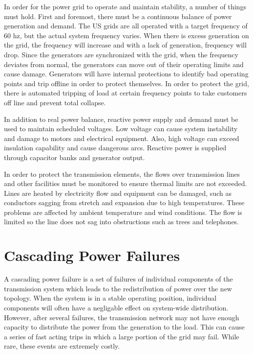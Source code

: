In order for the power grid to operate and maintain stability, a number of things must hold.  First and foremost, there must be a continuous balance of power generation and demand.  The US grids are all operated with a target frequency of 60 hz, but the actual system frequency varies.  When there is excess generation on the grid, the frequency will increase and with a lack of generation, frequency will drop.  Since the generators are synchronized with the grid, when the frequency deviates from normal, the generators can move out of their operating limits and cause damage.  Generators will have internal protections to identify bad operating points and trip offline in order to protect themselves.  In order to protect the grid, there is automated tripping of load at certain frequency points to take customers off line and prevent total collapse.  

In addition to real power balance, reactive power supply and demand must be used to maintain scheduled voltages.  Low voltage can cause system instability and damage to motors and electrical equipment.  Also, high voltage can exceed insulation capability and cause dangerous arcs.  Reactive power is supplied through capacitor banks and generator output.

In order to protect the transmission elements, the flows over transmission lines and other facilities must be monitored to ensure thermal limits are not exceeded.  Lines are heated by electricity flow and equipment can be damaged, such as conductors sagging from stretch and expansion due to high temperatures.  These problems are affected by ambient temperature and wind conditions.  The flow is limited so the line does not sag into obstructions such as trees and telephones.



\section{Cascading Power Failures}
A cascading power failure is a set of failures of individual components of the transmission system which leads to the redistribution of power over the new topology.
 When the system is in a stable operating position, individual components will often have a negligable effect on system-wide distribution.  However, after several failures, the transmission network may not have enough capacity to distribute the power from the generation to the load.  This can cause a series of fast acting trips in which a large portion of the grid may fail.  While rare, these events are extremely costly.


